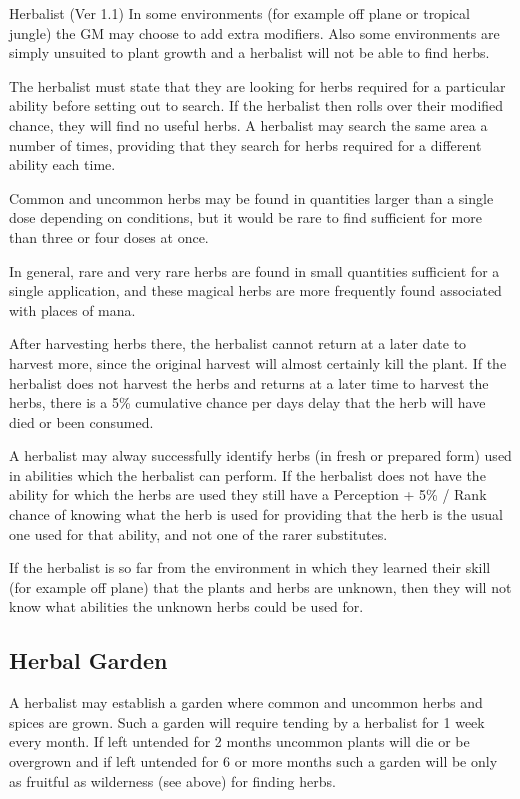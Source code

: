 \begin{Chapter}{Herbalist (Ver 1.1)}
In some environments (for example off plane or tropical jungle) the GM
may choose to add extra modifiers.  Also some environments are simply
unsuited to plant growth and a herbalist will not be able to find
herbs.

The herbalist must state that they are looking for herbs required for
a particular ability before setting out to search.  If the herbalist
then rolls over their modified chance, they will find no useful
herbs. A herbalist may search the same area a number of times,
providing that they search for herbs required for a different ability
each time.

Common and uncommon herbs may be found in quantities larger than a
single dose depending on conditions, but it would be rare to find
sufficient for more than three or four doses at once.

In general, rare and very rare herbs are found in small quantities
sufficient for a single application, and these magical herbs are more
frequently found associated with places of mana.

After harvesting herbs there, the herbalist cannot return at a later
date to harvest more, since the original harvest will almost certainly
kill the plant.  If the herbalist does not harvest the herbs and
returns at a later time to harvest the herbs, there is a 5\%
cumulative chance per days delay that the herb will have died or been
consumed.

A herbalist may alway successfully identify herbs (in fresh or
prepared form) used in abilities which the herbalist can perform.  If
the herbalist does not have the ability for which the herbs are used
they still have a Perception + 5\% / Rank chance of knowing what the
herb is used for providing that the herb is the usual one used for
that ability, and not one of the rarer substitutes.

If the herbalist is so far from the environment in which they learned
their skill (for example off plane) that the plants and herbs are
unknown, then they will not know what abilities the unknown herbs
could be used for.

\subsection{Herbal Garden}

A herbalist may establish a garden where common and uncommon herbs and
spices are grown. Such a garden will require tending by a herbalist
for 1 week every month.  If left untended for 2 months uncommon plants
will die or be overgrown and if left untended for 6 or more months
such a garden will be only as fruitful as wilderness (see above) for
finding herbs.


\end{Chapter}
